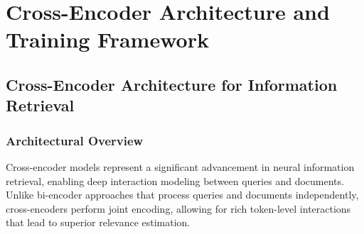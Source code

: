 
\chapter{Cross-Encoder Architecture and Training Framework} %

\label{Chapter4} %


\section{Cross-Encoder Architecture for Information Retrieval}

\subsection{Architectural Overview}

Cross-encoder models represent a significant advancement in neural information retrieval, enabling deep interaction modeling between queries and documents. Unlike bi-encoder approaches that process queries and documents independently, cross-encoders perform joint encoding, allowing for rich token-level interactions that lead to superior relevance estimation.

